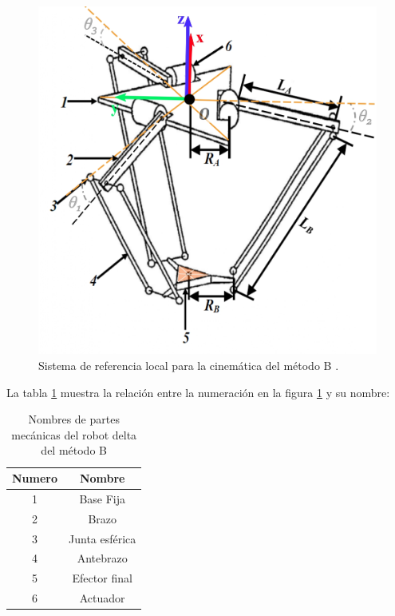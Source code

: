            \begin{figure}[htb]
                 \centering
                 \includegraphics[width=0.55\linewidth]{Main/Chapter4/Images4/DIBUJO24.jpg}
                  \caption{Sistema de referencia local para la cinemática del método B \cite{Path_Planning_and_Trajectory_Optimization}.}
                  \label{f:Cap4_Metodo_B_Modelacion_Cinematica_Posicion_1}
            \end{figure}        
        
        
        La tabla \ref{tab:cap4_tabla_11} muestra la relación entre la numeración en la figura \ref{f:Cap4_Metodo_B_Modelacion_Cinematica_Posicion_1} y su nombre:
        \begin{table}[h]
            \centering
            \begin{tabular}{c c}
            \hline
                \textbf{Numero}& \textbf{Nombre} \\ 
            \hline             \hline
             1 & Base Fija \\
            \hline
             2 & Brazo \\
            \hline
             3 & Junta esférica \\
            \hline
             4 & Antebrazo\\
            \hline
             5 & Efector final \\
             \hline
             6 & Actuador \\
             \hline
            \end{tabular}
           \caption{Nombres de partes mecánicas del robot delta del método B}
           \label{tab:cap4_tabla_11}
        \end{table}
        
        
        \newpage

